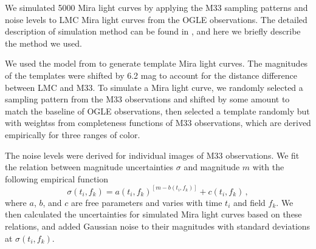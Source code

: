 We simulated 5000 Mira light curves by applying the M33 sampling patterns and noise levels to LMC Mira light curves from the OGLE observations. The detailed description of simulation method can be found in , and here we briefly describe the method we used. 

We used the model from  to generate template Mira light curves. The magnitudes of the templates were shifted by 6.2 mag to account for the distance difference between LMC and M33. To simulate a Mira light curve, we randomly selected a sampling pattern from the M33 observations and shifted by some amount to match the baseline of OGLE observations, then selected a template randomly but with weightss from completeness functions of M33 observations, which are derived empirically for three ranges of color.

The noise levels were derived for individual images of M33 observations. We fit the relation between magnitude uncertainties $\sigma$ and magnitude $m$ with the following empirical function
\begin{equation}
\sigma(t_i,f_k) = a(t_i,f_k)^{[m-b(t_i,f_k)]} + c(t_i,f_k)\,, \label{equ.sigma.mag}
\end{equation}
where $a$, $b$, and $c$ are free parameters and varies with time $t_i$ and field $f_k$. We then calculated the uncertainties for simulated Mira light curves based on these relations, and added Gaussian noise to their magnitudes with standard deviations at $\sigma(t_i,f_k)$.
